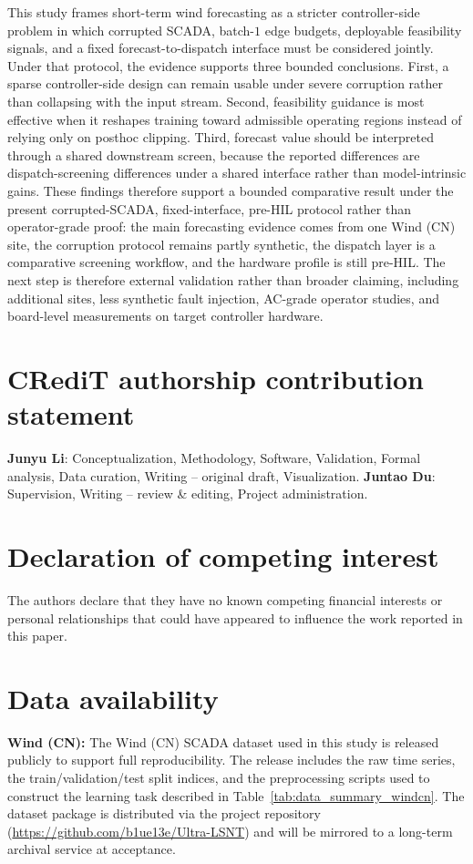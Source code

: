 ﻿\documentclass[review,1p,times]{elsarticle}
\begin{document}
This study frames short-term wind forecasting as a stricter controller-side problem in which corrupted SCADA, batch-$1$ edge budgets, deployable feasibility signals, and a fixed forecast-to-dispatch interface must be considered jointly. Under that protocol, the evidence supports three bounded conclusions. First, a sparse controller-side design can remain usable under severe corruption rather than collapsing with the input stream. Second, feasibility guidance is most effective when it reshapes training toward admissible operating regions instead of relying only on posthoc clipping. Third, forecast value should be interpreted through a shared downstream screen, because the reported differences are dispatch-screening differences under a shared interface rather than model-intrinsic gains. These findings therefore support a bounded comparative result under the present corrupted-SCADA, fixed-interface, pre-HIL protocol rather than operator-grade proof: the main forecasting evidence comes from one Wind (CN) site, the corruption protocol remains partly synthetic, the dispatch layer is a comparative screening workflow, and the hardware profile is still pre-HIL. The next step is therefore external validation rather than broader claiming, including additional sites, less synthetic fault injection, AC-grade operator studies, and board-level measurements on target controller hardware.

\section*{CRediT authorship contribution statement}
\textbf{Junyu Li}: Conceptualization, Methodology, Software, Validation, Formal analysis, Data curation, Writing -- original draft, Visualization.
\textbf{Juntao Du}: Supervision, Writing -- review \& editing, Project administration.

\section*{Declaration of competing interest}
The authors declare that they have no known competing financial interests or personal relationships that could have appeared to influence the work reported in this paper.

\section*{Data availability}
\textbf{Wind (CN):} The Wind (CN) SCADA dataset used in this study is released publicly to support full reproducibility. The release includes the raw time series, the train/validation/test split indices, and the preprocessing scripts used to construct the learning task described in Table~\ref{tab:data_summary_windcn}. The dataset package is distributed via the project repository (\url{https://github.com/b1ue13e/Ultra-LSNT}) and will be mirrored to a long-term archival service at acceptance.
\end{document}
